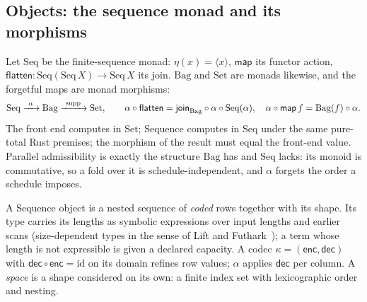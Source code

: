 \subsection{Objects: the sequence monad and its morphisms}
Let $\mathrm{Seq}$ be the finite-sequence monad: $\eta(x)=\langle x\rangle$,
$\mathsf{map}$ its functor action, $\mathsf{flatten}:\mathrm{Seq}(\mathrm{Seq}\,X)\to\mathrm{Seq}\,X$
its join. $\mathrm{Bag}$ and $\mathrm{Set}$ are monads likewise, and the
forgetful maps are monad morphisms:
\[
 \mathrm{Seq}\xrightarrow{\ \alpha\ }\mathrm{Bag}\xrightarrow{\ \mathrm{supp}\ }\mathrm{Set},
 \qquad \alpha\circ\mathsf{flatten}=\mathsf{join}_{\rm Bag}\circ\alpha\circ\mathrm{Seq}(\alpha),
 \quad \alpha\circ\mathsf{map}\,f=\mathrm{Bag}(f)\circ\alpha .
\]
The front end computes in $\mathrm{Set}$; Sequence computes in
$\mathrm{Seq}$ under the same pure-total Rust premises; the morphism of the
result must equal the front-end value. Parallel admissibility is exactly the
structure $\mathrm{Bag}$ has and $\mathrm{Seq}$ lacks: its monoid is
commutative, so a fold over it is schedule-independent, and $\alpha$
forgets the order a schedule imposes.

A Sequence object is a nested sequence of \emph{coded} rows together with
its shape. Its type carries its lengths as symbolic expressions over input
lengths and earlier scans (size-dependent types in the sense of
Lift and Futhark~\cite{paper-lift,paper-futhark}); a term whose length is
not expressible is given a declared capacity. A codec
$\kappa=(\mathsf{enc},\mathsf{dec})$ with $\mathsf{dec}\circ\mathsf{enc}=\mathrm{id}$
on its domain refines row values; $\alpha$ applies $\mathsf{dec}$ per
column. A \emph{space} is a shape considered on its own: a finite index set
with lexicographic order and nesting.

